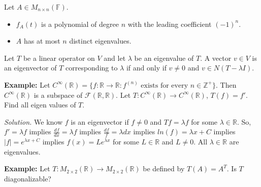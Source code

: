 \documentclass[12pt]{article}
\newenvironment{theorem}[2][Theorem]{\begin{trivlist}
\item[\hskip \labelsep {\bfseries #1}\hskip \labelsep {\bfseries #2.}]}{\end{trivlist}}
\begin{document}
\begin{theorem}{5.3}
Let $A \in M_{n \times n}(\mathbb{F})$.

\begin{itemize}
    \item $f_A(t)$ is a polynomial of degree $n$ with the leading coefficient $(-1)^n$.
    
    \item $A$ has at most $n$ distinct eigenvalues.
\end{itemize}
\end{theorem}

\begin{theorem}{5.4}
Let $T$ be a linear operator on $V$ and let $\lambda$ be an eigenvalue of $T$. A vector $v \in V$ is an eigenvector of $T$ corresponding to $\lambda$ if and only if $v \neq 0$ and $v \in N(T - \lambda I)$.
\end{theorem}

\noindent\textbf{Example:} Let $C^\infty(\mathbb{R}) = \{f : \mathbb{R} \to \mathbb{R} : f^{(n)} \text{ exists for every }n \in \mathbb{Z}^+\}$. Then $C^\infty(\mathbb{R})$ is a subspace of $\mathcal{F}(\mathbb{R}, \mathbb{R})$. Let $T : C^\infty(\mathbb{R}) \to C^\infty(\mathbb{R})$, $T(f) = f'$. Find all eigen values of $T$. 

\textit{Solution.} We know $f$ is an eigenvector if $f \neq 0$ and $Tf = \lambda f$ for some $\lambda \in \mathbb{R}$. So, $f' = \lambda f$ implies $\frac{df}{dx} = \lambda f$ implies $\frac{df}{f} = \lambda dx$ implies $ln(f) = \lambda x + C$ implies $| f | = e^{\lambda x + C}$ implies $f(x) = Le^{\lambda x}$ for some $L \in \mathbb{R}$ and $L \neq 0$. All $\lambda \in \mathbb{R}$ are eigenvalues. 

\noindent\textbf{Example:} Let $T : M_{2 \times 2}(\mathbb{R}) \to M_{2 \times 2}(\mathbb{R})$ be defined by $T(A) = A^T$. Is $T$ diagonalizable?
\end{document}
